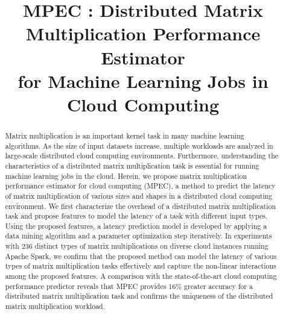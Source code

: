 \documentclass[10pt, conference, compsocconf]{IEEEtran}
\begin{document}

\title{MPEC : Distributed Matrix Multiplication Performance Estimator \\for Machine Learning Jobs in Cloud Computing}

\author{
\and
{}
}

\maketitle

\begin{abstract}
  Matrix multiplication is an important kernel task in many machine learning algorithms. As the size of input datasets increase, multiple workloads are analyzed in large-scale distributed cloud computing environments. Furthermore, understanding the characteristics of a distributed matrix multiplication task is essential for running machine learning jobs in the cloud. Herein, we propose matrix multiplication performance estimator for cloud computing (MPEC), a method to predict the latency of matrix multiplication of various sizes and shapes in a distributed cloud computing environment. We first characterize the overhead of a distributed matrix multiplication task and propose features to model the latency of a task with different input types. Using the proposed features, a latency prediction model is developed by applying a data mining algorithm and a parameter optimization step iteratively. In experiments with 236 distinct types of matrix multiplications on diverse cloud instances running Apache Spark, we confirm that the proposed method can model the latency of various types of matrix multiplication tasks effectively and capture the non-linear interactions among the proposed features. A comparison with the state-of-the-art cloud computing performance predictor reveals that MPEC provides 16\% greater accuracy for a distributed matrix multiplication task and confirms the uniqueness of the distributed matrix multiplication workload.
\end{abstract}
\end{document}
